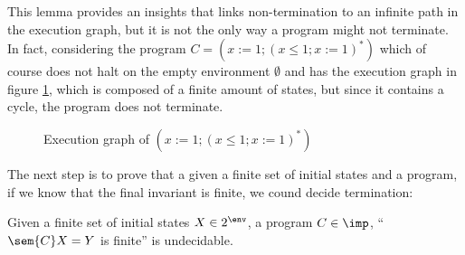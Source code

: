 \begin{example}\label{ex:loop}
  This lemma provides an insights that links non-termination to an
  infinite path in the execution graph, but it is not the only way a
  program might not terminate. In fact, considering the program \(C =
  (x:=1; (x\leq 1; x:=1)^*)\) which of course does not halt on the
  empty environment \(\emptyset\) and has the execution graph in
  figure \ref{fig:exegraphnont}, which is composed of a finite amount
  of states, but since it contains a cycle, the program does not
  terminate.

  \begin{figure}
    \centering
    \usetikzlibrary{positioning}
    \caption{Execution graph of \((x:=1; (x\leq 1;
      x:=1)^*)\)}\label{fig:exegraphnont}
  \end{figure}
\end{example}


The next step is to prove that a given a finite set of initial states
and a program, if we know that the final invariant is finite, we cound
decide termination:

\begin{lemma}
  Given a finite set of initial states \(X \in 2^\env\), a program
  \(C\in\imp\), ``\(\sem{C}X = Y\) is finite'' is undecidable.
\end{lemma}

